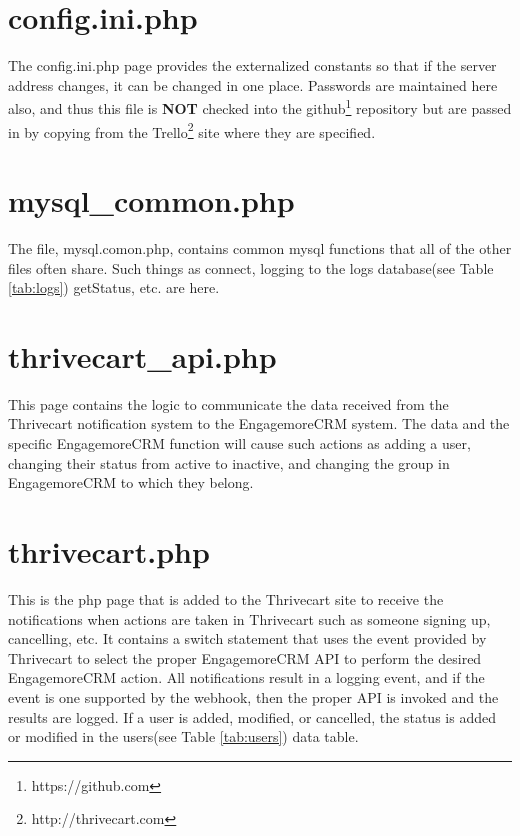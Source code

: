 \documentclass[final,letterpaper,12pt]{article}
\begin{document}
\begin{appendices}

\section{config.ini.php}
\noindent The config.ini.php page provides the externalized constants so that if the server address changes, it can be changed in one place.  Passwords are maintained here also, and thus this file is {\bf NOT} checked into the github\footnote{https://github.com} repository but are passed in by copying from the Trello\footnote{http://thrivecart.com} site where they are specified.



\section{mysql\_common.php}
\noindent The file, mysql.comon.php, contains common mysql functions that all of the other files often share.  Such things as connect, logging to the logs database(see Table \ref{tab:logs}) getStatus, etc. are here.



\section{thrivecart\_api.php}
\noindent This page contains the logic to communicate the data received from the Thrivecart notification system to the EngagemoreCRM system.  The data and the specific EngagemoreCRM function will cause such actions as adding a user, changing their status from active to inactive, and changing the group in EngagemoreCRM to which they belong.



\section{thrivecart.php}
\noindent This is the php page that is added to the Thrivecart site to receive the notifications when actions are taken in Thrivecart such as someone signing up, cancelling, etc.  It contains a switch statement that uses the event provided by Thrivecart to select the proper EngagemoreCRM API to perform the desired EngagemoreCRM action.  All notifications result in a logging event, and if the event is one supported by the webhook, then the proper API is invoked and the results are logged.  If a user is added, modified, or cancelled, the status is added or modified in the users(see Table \ref{tab:users}) data table.


\end{appendices}
\end{document}
